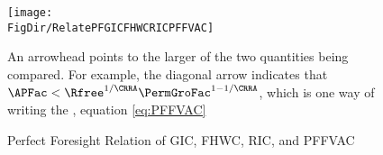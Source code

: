 \begin{figure}
  \centerline{\texttt{[image: \\FigDir/RelatePFGICFHWCRICPFFVAC]}}
  \caption{Perfect Foresight Relation of {GIC}, {FHWC}, {RIC}, and {PFFVAC}}
  \footnotesize{An arrowhead points to the larger of the two quantities being compared.  For example, the diagonal arrow indicates that $\APFac < \Rfree^{1/\CRRA}\PermGroFac^{1-1/\CRRA}$, which is one way of writing the {\PFFVAC}, equation \eqref{eq:PFFVAC}}
\end{figure}
